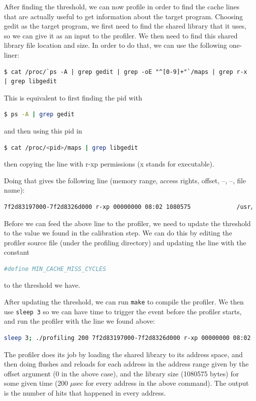 After finding the threshold, we can now profile in order to find the cache lines that are actually useful to get information about the target program. Choosing gedit as the target program, we first need to find the shared library that it uses, so we can give it as an input to the profiler. We then need to find this shared library file location and size. In order to do that, we can use the following one-liner:
\begin{lstlisting}
$ cat /proc/`ps -A | grep gedit | grep -oE "^[0-9]+"`/maps | grep r-x | grep libgedit
\end{lstlisting}
This is equivalent to first finding the pid with
\begin{lstlisting}[language=bash]
  $ ps -A | grep gedit
\end{lstlisting}
and then using this pid in
\begin{lstlisting}[language=bash]
  $ cat /proc/<pid>/maps | grep libgedit
\end{lstlisting}
then copying the line with r-xp permissions (x stands for executable).

Doing that gives the following line (memory range, access rights, offset, –, –, file name):

\begin{lstlisting}[language=bash]
7f2d83197000-7f2d8326d000 r-xp 00000000 08:02 1080575             /usr/lib/gedit/libgedit.so
\end{lstlisting}

Before we can feed the above line to the profiler, we need to update the threshold to the value we found in the calibration step. We can do this by editing the profiler source file (under the profiling directory) and updating the line with the constant 
\begin{lstlisting}[language=bash]
#define MIN_CACHE_MISS_CYCLES
\end{lstlisting}
to the threshold we have.

After updating the threshold, we can run \texttt{make} to compile the profiler. We then use \texttt{sleep 3} so we can have time to trigger the event before the profiler starts, and run the profiler with the line we found above: 
\begin{lstlisting}[language=bash]
sleep 3; ./profiling 200 7f2d83197000-7f2d8326d000 r-xp 00000000 08:02 1080575                    /usr/lib/gedit/libgedit.so
\end{lstlisting}

The profiler does its job by loading the shared library to its address space, and then doing flushes and reloads for each address in the address range given by the offset argument (0 in the above case), and the library size (1080575 bytes) for some given time (200 $\mu$sec for every address in the above command). The output is the number of hits that happened in every address.

